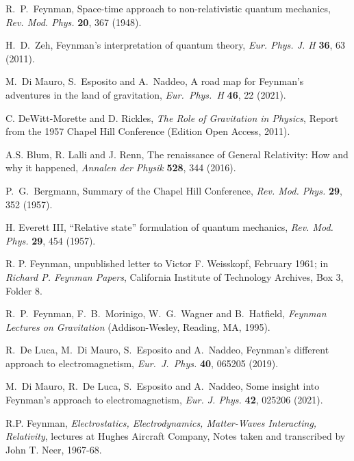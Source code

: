 \documentclass{ws-procs961x669}            %
\begin{document}

\begin{thebibliography}{10}

R.~P.~Feynman, Space-time approach to non-relativistic quantum mechanics, {\em Rev. Mod. Phys.} {\bf 20}, 367 (1948).

H.~D.~Zeh, Feynman's interpretation of quantum theory, {\em Eur.
Phys. J. H}  {\bf 36}, 63 (2011).

M.~Di Mauro, S.~Esposito and A.~Naddeo, A road map for Feynman's adventures in the land of gravitation, {\em Eur.\ Phys.\ H} {\bf 46}, 22 (2021).

C. DeWitt-Morette and D. Rickles, {\em The Role of Gravitation in Physics}, Report from the 1957 Chapel Hill Conference (Edition Open Access, 2011).

A.S. Blum, R. Lalli and J. Renn, The renaissance of General Relativity: How and why it happened,
{\em Annalen der Physik} {\bf 528}, 344 (2016).

P.~G.~Bergmann, Summary of the Chapel Hill Conference, {\em Rev. Mod. Phys.} {\bf 29}, 352 (1957).

H. Everett III, ``Relative state'' formulation of quantum mechanics, {\em Rev. Mod. Phys.} {\bf 29}, 454 (1957).

R. P. Feynman, unpublished letter to Victor F. Weisskopf, February 1961; in  {\em Richard P. Feynman Papers}, California Institute of Technology Archives, Box 3, Folder 8.

R.~P.~Feynman, F.~B.~Morinigo, W.~G.~Wagner and B.~Hatfield, {\em Feynman Lectures on Gravitation} (Addison-Wesley, Reading, MA, 1995).

R.~De Luca, M.~Di Mauro, S.~Esposito and A.~Naddeo, Feynman's
different approach to electromagnetism, {\em Eur.\ J.\ Phys.} {\bf
40}, 065205 (2019).

M.~Di Mauro, R.~De Luca, S.~Esposito and A.~Naddeo, Some insight
into Feynman's approach to electromagnetism, {\em Eur. J. Phys.}
{\bf 42}, 025206 (2021).

R.P. Feynman, {\em Electrostatics, Electrodynamics, Matter-Waves
Interacting, Relativity}, lectures at Hughes Aircraft Company,
Notes taken and transcribed by John T. Neer, 1967-68.


\end{thebibliography}
\end{document}
